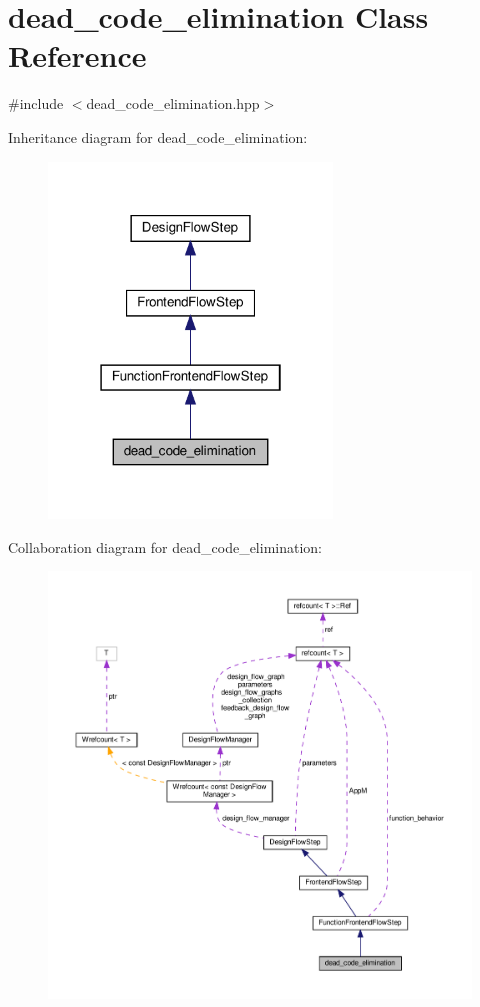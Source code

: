 \hypertarget{classdead__code__elimination}{}\section{dead\+\_\+code\+\_\+elimination Class Reference}
\label{classdead__code__elimination}


{\ttfamily \#include $<$dead\+\_\+code\+\_\+elimination.\+hpp$>$}



Inheritance diagram for dead\+\_\+code\+\_\+elimination\+:
\nopagebreak
\begin{figure}[H]
\begin{center}
\leavevmode
\includegraphics[width=214pt]{d6/d84/classdead__code__elimination__inherit__graph}
\end{center}
\end{figure}


Collaboration diagram for dead\+\_\+code\+\_\+elimination\+:
\nopagebreak
\begin{figure}[H]
\begin{center}
\leavevmode
\includegraphics[width=350pt]{d0/ddd/classdead__code__elimination__coll__graph}
\end{center}
\end{figure}
